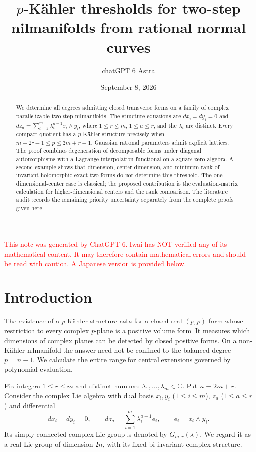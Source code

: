 \documentclass[12pt]{amsart}
\title[$p$-K\"ahler thresholds for two-step nilmanifolds]{$p$-K\"ahler thresholds for two-step nilmanifolds from rational normal curves}
\author{chatGPT 6 Astra}
\date{September 8, 2026}
\theoremstyle{definition}
\theoremstyle{remark}
\numberwithin{equation}{section}
\newcommand{\C}{\mathbb{C}}
\newcommand{\xr}[1]{\textcolor{red}{#1}}
\begin{document}
\begin{abstract}
We determine all degrees admitting closed transverse forms on a family of
complex parallelizable two-step nilmanifolds. The structure equations are
$d x_i=d y_i=0$ and $d z_a=\sum_{i=1}^m\lambda_i^{a-1}x_i\wedge y_i$,
where $1\leq r\leq m$, $1\leq a\leq r$, and the $\lambda_i$ are distinct.
Every compact quotient has a $p$-K\"ahler structure precisely when
$m+2r-1\leq p\leq 2m+r-1$. Gaussian rational parameters admit explicit
lattices. The proof combines degeneration of decomposable forms under
diagonal automorphisms with a Lagrange interpolation functional on a
square-zero algebra. A second example shows that dimension, center dimension,
and minimum rank of invariant holomorphic exact two-forms do not determine this threshold.
The one-dimensional-center case is classical; the proposed contribution
is the evaluation-matrix calculation for higher-dimensional centers and
the rank comparison. The literature audit records the remaining priority
uncertainty separately from the complete proofs given here.
\end{abstract}
\maketitle


\xr{This note was generated by ChatGPT 6. Iwai has NOT verified any of its mathematical content. It may therefore contain mathematical errors and should be read with caution. A Japanese version is provided below.}

\section{Introduction}
The existence of a $p$-K\"ahler structure asks for a closed real $(p,p)$-form
whose restriction to every complex $p$-plane is a positive volume form.
It measures which dimensions of complex planes can be detected by closed
positive forms. On a non-K\"ahler nilmanifold the answer need not be confined
to the balanced degree $p=n-1$. We calculate the entire range for central
extensions governed by polynomial evaluation.

Fix integers $1\leq r\leq m$ and distinct numbers
$\lambda_1,\ldots,\lambda_m\in\C$. Put $n=2m+r$. Consider the complex Lie
algebra with dual basis $x_i,y_i$ ($1\leq i\leq m$), $z_a$ ($1\leq a\leq r$)
and differential
\begin{equation}\label{en:equations}
 d x_i=d y_i=0,\qquad
 d z_a=\sum_{i=1}^m\lambda_i^{a-1}e_i,\qquad e_i=x_i\wedge y_i.
\end{equation}
Its simply connected complex Lie group is denoted by $G_{m,r}(\lambda)$.
We regard it as a real Lie group of dimension $2n$, with its fixed
bi-invariant complex structure.
\end{document}
